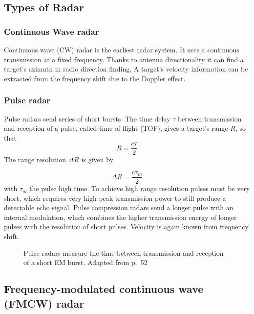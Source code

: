 \subsection{Types of Radar}\label{types-of-radar}

\subsubsection{Continuous Wave radar}\label{continuous-wave-cw-radar}

Continuous wave (CW) radar is the earliest radar system. It uses a continuous transmission
at a fixed frequency. Thanks to antenna directionality it can find a target's azimuth in radio direction finding. A target's velocity
information can be extracted from the frequency shift due to the Doppler
effect.

\subsubsection{Pulse radar}\label{pulse-radar}

Pulse radars send series of short bursts. The time delay \(\tau\)
between transmission and reception of a pulse, called time of flight
(TOF), gives a target's range \(R\), so that 
\begin{equation} \label{eq:tof}
	 R = \frac{c\tau}{2} 
\end{equation}
The range resolution \(\Delta R\) is given by

\begin{equation} \label{eq:tof_res}
	\Delta R = \frac{c\tau_m}{2}
\end{equation}
with \(\tau_m\) the pulse high time. To
achieve high range resolution pulses must be very short, which requires
very high peak transmission power to still produce a detectable echo
signal. Pulse compression radars send a longer pulse with an internal
modulation, which combines the higher transmission energy of longer
pulses with the resolution of short pulses. Velocity is again known from
frequency shift.

\begin{figure}[htp]
    \centering
    \def\svgwidth{10cm}
    
    \caption{\label{fig:radar_pulse}Pulse radars measure the time between transmission and reception of a short EM burst. Adapted from \cite{Adams2012} p.~52}
\end{figure}


\subsection{Frequency-modulated continuous wave (FMCW) radar}\label{frequency-modulated-continuous-wave-fmcw-radar}

